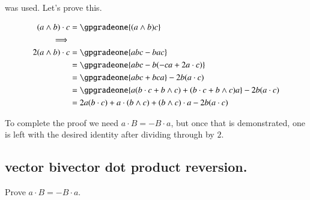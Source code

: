 was used.  Let's prove this.

\begin{align*}
(a \wedge b) \cdot c
&= \gpgradeone{(a \wedge b) c} \\
\implies \\
2 (a \wedge b) \cdot c
&= \gpgradeone{a b c - b a c} \\
&= \gpgradeone{a b c - b (- c a + 2 a \cdot c )} \\
&= \gpgradeone{a b c + b c a} - 2 b (a \cdot c ) \\
&= \gpgradeone{a (b \cdot c + b \wedge c) + (b \cdot c + b \wedge c) a} - 2 b (a \cdot c ) \\
&= 2 a (b \cdot c) + a \cdot (b \wedge c) + (b \wedge c) \cdot a - 2 b (a \cdot c ) \\
\end{align*}

To complete the proof we need $a \cdot B = -B \cdot a$, but once that is demonstrated, one is left with the desired identity after dividing through
by $2$.

\subsection{vector bivector dot product reversion. }

Prove $a \cdot B = -B \cdot a$.

%
%

%
